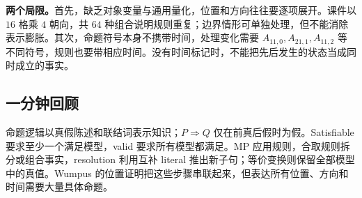 \textbf{两个局限。}首先，缺乏对象变量与通用量化，位置和方向往往要逐项展开。课件以 $16$ 格乘 $4$ 朝向，共 $64$ 种组合说明规则重复；边界情形可单独处理，但不能消除表示膨胀。其次，命题符号本身不携带时间，处理变化需要 $A_{11,0},A_{21,1},A_{11,2}$ 等不同符号，规则也要带相应时间。没有时间标记时，不能把先后发生的状态当成同时成立的事实。

\subsection{一分钟回顾}

命题逻辑以真假陈述和联结词表示知识；$P\Rightarrow Q$ 仅在前真后假时为假。Satisfiable 要求至少一个满足模型，valid 要求所有模型都满足。MP 应用规则，合取规则拆分或组合事实，resolution 利用互补 literal 推出新子句；等价变换则保留全部模型中的真值。Wumpus 的位置证明把这些步骤串联起来，但表达所有位置、方向和时间需要大量具体命题。
\endgroup
